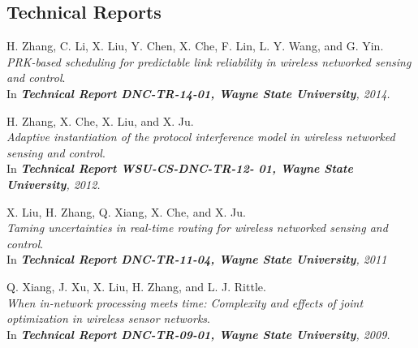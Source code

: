 \subsection{Technical Reports}
\begin{thebibliography}{4}
H. Zhang, C. Li, X. Liu, Y. Chen, X. Che, F. Lin, L. Y. Wang, and G. Yin.
\\ \newblock \emph{PRK-based scheduling for predictable link reliability in wireless networked sensing and control}.
\\ \newblock In \emph{\textbf{Technical Report DNC-TR-14-01, Wayne State University}, 2014.}

H. Zhang, X. Che, X. Liu, and X. Ju.
\\ \newblock \emph{Adaptive instantiation of the protocol interference model in wireless networked sensing and control}.
\\ \newblock In \emph{\textbf{Technical Report WSU-CS-DNC-TR-12- 01, Wayne State University}, 2012.}

X. Liu, H. Zhang, Q. Xiang, X. Che, and X. Ju.
\\ \newblock \emph{Taming uncertainties in real-time routing for wireless networked sensing and control}.
\\ \newblock In \emph{\textbf{Technical Report DNC-TR-11-04, Wayne State University}, 2011}

Q. Xiang, J. Xu, X. Liu, H. Zhang, and L. J. Rittle.
\\ \newblock \emph{When in-network processing meets time: Complexity and effects of joint optimization in wireless sensor networks}.
\\ \newblock In \emph{\textbf{Technical Report DNC-TR-09-01, Wayne State University}, 2009.}
\end{thebibliography}

